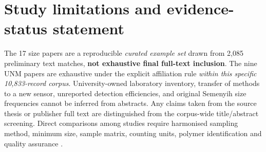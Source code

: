 \documentclass[10pt,a4paper]{article}
\begin{document}
\section{Study limitations and evidence-status statement}
The 17 size papers are a reproducible \emph{curated example set} drawn from 2,085 preliminary text matches, \textbf{not exhaustive final full-text inclusion}. The nine UNM papers are exhaustive under the explicit affiliation rule \emph{within this specific 10,833-record corpus}. University-owned laboratory inventory, transfer of methods to a new sensor, unreported detection efficiencies, and original Semenyih size frequencies cannot be inferred from abstracts. Any claims taken from the source thesis or publisher full text are distinguished from the corpus-wide title/abstract screening. Direct comparisons among studies require harmonised sampling method, minimum size, sample matrix, counting units, polymer identification and quality assurance \cite{Lofty2023}.
\printbibliography[title={IEEE-style references with DOI links}]
\end{document}
